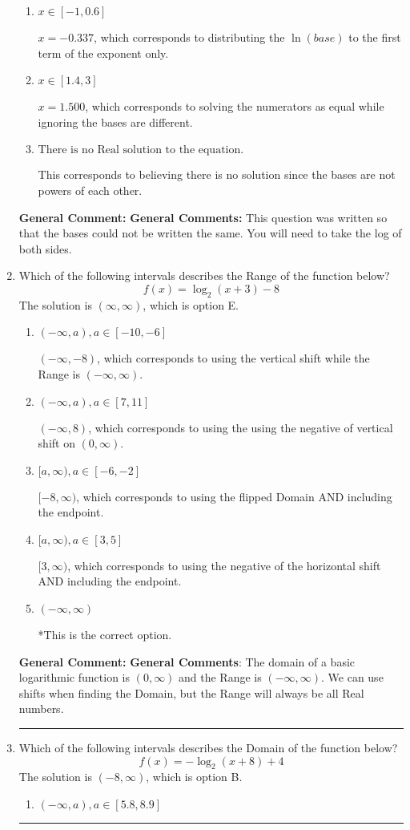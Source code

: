 \documentclass{extbook}[14pt]
\newcommand{\litem}[1]{\item #1

\rule{\textwidth}{0.4pt}}
\begin{document}
\begin{enumerate}
{\begin{enumerate}[label=\Alph*.]
$x = 13.901$, which corresponds to distributing the $\ln(base)$ to the second term of the exponent only.
\item \( x \in [-1, 0.6] \)

$x = -0.337$, which corresponds to distributing the $\ln(base)$ to the first term of the exponent only.
\item \( x \in [1.4, 3] \)

$x = 1.500$, which corresponds to solving the numerators as equal while ignoring the bases are different.
\item \( \text{There is no Real solution to the equation.} \)

This corresponds to believing there is no solution since the bases are not powers of each other.
\end{enumerate}

\textbf{General Comment:} \textbf{General Comments:} This question was written so that the bases could not be written the same. You will need to take the log of both sides.
}
\litem{
Which of the following intervals describes the Range of the function below?
\[ f(x) = \log_2{(x+3)}-8 \]The solution is \( (\infty, \infty) \), which is option E.\begin{enumerate}[label=\Alph*.]
\item \( (-\infty, a), a \in [-10, -6] \)

$(-\infty, -8)$, which corresponds to using the vertical shift while the Range is $(-\infty, \infty)$.
\item \( (-\infty, a), a \in [7, 11] \)

$(-\infty, 8)$, which corresponds to using the using the negative of vertical shift on $(0, \infty)$.
\item \( [a, \infty), a \in [-6, -2] \)

$[-8, \infty)$, which corresponds to using the flipped Domain AND including the endpoint.
\item \( [a, \infty), a \in [3, 5] \)

$[3, \infty)$, which corresponds to using the negative of the horizontal shift AND including the endpoint.
\item \( (-\infty, \infty) \)

*This is the correct option.
\end{enumerate}

\textbf{General Comment:} \textbf{General Comments}: The domain of a basic logarithmic function is $(0, \infty)$ and the Range is $(-\infty, \infty)$. We can use shifts when finding the Domain, but the Range will always be all Real numbers.
}
\litem{
Which of the following intervals describes the Domain of the function below?
\[ f(x) = -\log_2{(x+8)}+4 \]The solution is \( (-8, \infty) \), which is option B.\begin{enumerate}[label=\Alph*.]
\item \( (-\infty, a), a \in [5.8, 8.9] \)


\end{enumerate}}
\end{enumerate}
\end{document}
